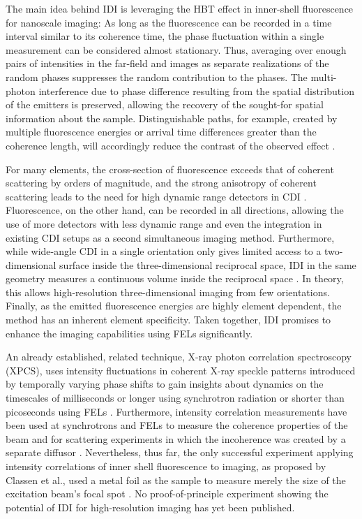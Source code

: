 The main idea behind IDI is leveraging the HBT effect in inner-shell fluorescence for nanoscale imaging: As long as the fluorescence can be recorded in a time interval similar to its coherence time, the phase fluctuation within a single measurement can be considered almost stationary. Thus, averaging over enough pairs of intensities in the far-field and images as separate realizations of the random phases suppresses the random contribution to the phases.  The multi-photon interference due to phase difference resulting from the spatial distribution of the emitters is preserved,  allowing the recovery of the sought-for spatial information about the sample. Distinguishable paths, for example, created by multiple fluorescence energies or arrival time differences greater than the coherence length, will accordingly reduce the contrast of the observed effect \cite{classen2017,trost2020}. 

For many elements, the cross-section of fluorescence exceeds that of coherent scattering by orders of magnitude, and the strong anisotropy of coherent scattering leads to the need for high dynamic range detectors in CDI \cite{xraylib,attwood1999}.  Fluorescence, on the other hand, can be recorded in all directions, allowing the use of more detectors with less dynamic range and even the integration in existing CDI setups as a second simultaneous imaging method. Furthermore, while wide-angle CDI in a single orientation only gives limited access to a two-dimensional surface inside the three-dimensional reciprocal space, IDI in the same geometry measures a continuous volume inside the reciprocal space \cite{barke2015,classen2017}. In theory, this allows high-resolution three-dimensional imaging from few orientations. Finally, as the emitted fluorescence energies are highly element dependent, the method has an inherent element specificity. Taken together, IDI promises to enhance the imaging capabilities using FELs significantly. 

An already established, related technique, X-ray photon correlation spectroscopy (XPCS), uses intensity fluctuations in coherent X-ray speckle patterns introduced by temporally varying phase shifts to gain insights about dynamics on the timescales of milliseconds or longer using synchrotron radiation or shorter than picoseconds using FELs \cite{lehmkuhler2021,grubel2007}. Furthermore, intensity correlation measurements have been used at synchrotrons and FELs to measure the coherence properties of the beam and for scattering experiments in which the incoherence was created by a separate diffusor \cite{yabashi2002,singer2013,inoue2019,gorobtsov2018,schneider2018}.  Nevertheless, thus far, the only successful experiment applying intensity correlations of inner shell fluorescence to imaging, as proposed by Classen et al., used a metal foil as the sample to measure merely the size of the excitation beam's focal spot \cite{nakumura2020}. No proof-of-principle experiment showing the potential of IDI for high-resolution imaging has yet been published. 


